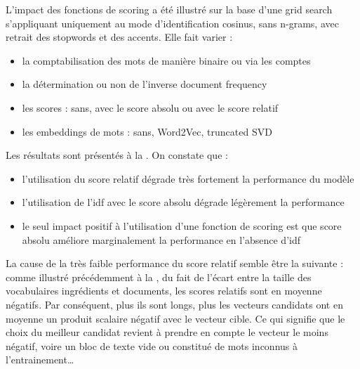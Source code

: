             L'impact des fonctions de scoring a été illustré sur la base d'une grid search s'appliquant uniquement au mode d'identification cosinus, sans n-grams, avec retrait des stopwords et des accents.
            Elle fait varier :
            \begin{itemize}
                \item la comptabilisation des mots de manière binaire ou via les comptes
                \item la détermination ou non de l'inverse document frequency
                \item les scores : sans, avec le score absolu ou avec le score relatif
                \item les embeddings de mots : sans, Word2Vec, truncated SVD
            \end{itemize}
            Les résultats sont présentés à la .
            On constate que : 
            \begin{itemize}
                \item l'utilisation du score relatif dégrade très fortement la performance du modèle
                \item l'utilisation de l'idf avec le score absolu dégrade légèrement la performance
                \item le seul impact positif à l'utilisation d'une fonction de scoring est que score absolu améliore marginalement la performance en l'absence d'idf
            \end{itemize}
            La cause de la très faible performance du score relatif semble être la suivante : comme illustré précédemment à la , du fait de l'écart entre la taille des vocabulaires ingrédients et documents, les scores relatifs sont en moyenne négatifs.
            Par conséquent, plus ils sont longs, plus les vecteurs candidats ont en moyenne un produit scalaire négatif avec le vecteur cible.
            Ce qui signifie que le choix du meilleur candidat revient à prendre en compte le vecteur le moins négatif, voire un bloc de texte vide ou constitué de mots inconnus à l'entrainement\dots            

